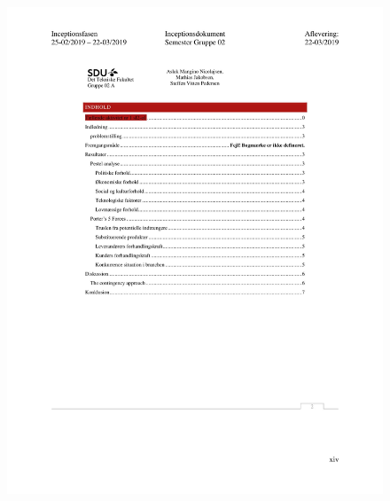 \begin{figure}[hb]
  \includegraphics[scale = 0.33]{./PNG/Inceptions/Gruppe02+InceptionsDokument-47.jpg} 
\end{figure}

